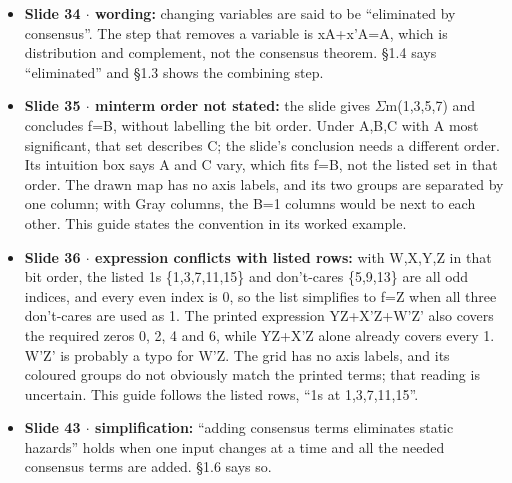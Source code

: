\documentclass[11pt]{article}
\begin{document}
\begin{keepsection}
\begin{itemize}
\item \textbf{Slide 34 \ensuremath{\cdot} wording:} changing variables are said to be “eliminated by consensus”. The step that removes a variable is xA+x'A=A, which is distribution and complement, not the consensus theorem. §1.4 says “eliminated” and §1.3 shows the combining step.
\item \textbf{Slide 35 \ensuremath{\cdot} minterm order not stated:} the slide gives \ensuremath{\Sigma}m(1,3,5,7) and concludes f=B, without labelling the bit order. Under A,B,C with A most significant, that set describes C; the slide’s conclusion needs a different order. Its intuition box says A and C vary, which fits f=B, not the listed set in that order. The drawn map has no axis labels, and its two groups are separated by one column; with Gray columns, the B=1 columns would be next to each other. This guide states the convention in its worked example.
\item \textbf{Slide 36 \ensuremath{\cdot} expression conflicts with listed rows:} with W,X,Y,Z in that bit order, the listed 1s \{1,3,7,11,15\} and don’t-cares \{5,9,13\} are all odd indices, and every even index is 0, so the list simplifies to f=Z when all three don’t-cares are used as 1. The printed expression YZ+X'Z+W'Z' also covers the required zeros 0, 2, 4 and 6, while YZ+X'Z alone already covers every 1. W'Z' is probably a typo for W'Z. The grid has no axis labels, and its coloured groups do not obviously match the printed terms; that reading is uncertain. This guide follows the listed rows, “1s at 1,3,7,11,15”.
\item \textbf{Slide 43 \ensuremath{\cdot} simplification:} “adding consensus terms eliminates static hazards” holds when one input changes at a time and all the needed consensus terms are added. §1.6 says so.
\end{itemize}
\end{keepsection}
\end{document}
